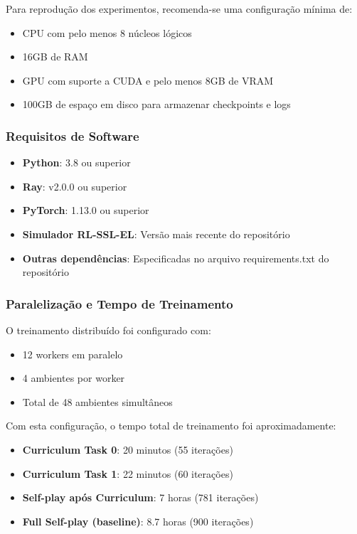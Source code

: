Para reprodução dos experimentos, recomenda-se uma configuração mínima de:

\begin{itemize}
    \item CPU com pelo menos 8 núcleos lógicos
    \item 16GB de RAM
    \item GPU com suporte a CUDA e pelo menos 8GB de VRAM
    \item 100GB de espaço em disco para armazenar checkpoints e logs
\end{itemize}

\subsubsection{Requisitos de Software}

\begin{itemize}
    \item \textbf{Python}: 3.8 ou superior
    \item \textbf{Ray}: v2.0.0 ou superior
    \item \textbf{PyTorch}: 1.13.0 ou superior
    \item \textbf{Simulador RL-SSL-EL}: Versão mais recente do repositório
    \item \textbf{Outras dependências}: Especificadas no arquivo requirements.txt do repositório
\end{itemize}

\subsubsection{Paralelização e Tempo de Treinamento}

O treinamento distribuído foi configurado com:

\begin{itemize}
    \item 12 workers em paralelo
    \item 4 ambientes por worker
    \item Total de 48 ambientes simultâneos
\end{itemize}

Com esta configuração, o tempo total de treinamento foi aproximadamente:

\begin{itemize}
    \item \textbf{Curriculum Task 0}: 20 minutos (55 iterações)
    \item \textbf{Curriculum Task 1}: 22 minutos (60 iterações)
    \item \textbf{Self-play após Curriculum}: 7 horas (781 iterações)
    \item \textbf{Full Self-play (baseline)}: 8.7 horas (900 iterações)
\end{itemize}

